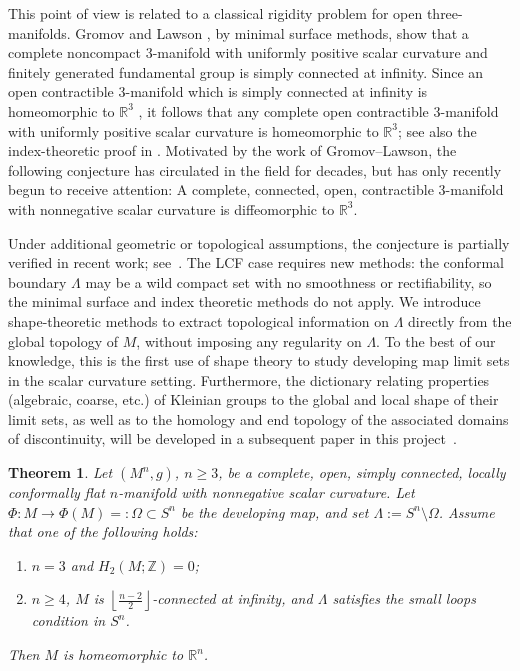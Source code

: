 \documentclass[12pt,oneside,a4paper]{article}
\newtheorem{theoremE}{Theorem}
\theoremstyle{mytheorem}
\theoremstyle{remark}
\theoremstyle{definition}
\begin{document}
This point of view is related to a classical rigidity problem for open
three-manifolds.  Gromov and Lawson
\cite[Corollary~10.9]{MR720933}, by minimal surface methods, show that a
complete noncompact \(3\)-manifold with uniformly positive scalar curvature and finitely
generated fundamental group is simply connected at infinity.  Since an open
contractible \(3\)-manifold which is simply connected at infinity is
homeomorphic to \(\mathbb R^3\) \cite{275662}, it follows that
any complete open contractible \(3\)-manifold with uniformly positive scalar
curvature is homeomorphic to \(\mathbb R^3\); see also the index-theoretic
proof in \cite[Theorem~1]{MR2721617}.  Motivated by the work of Gromov--Lawson, the following conjecture has circulated in the field for decades, but has only recently begun to receive attention: A complete, connected, open, contractible \(3\)-manifold with nonnegative scalar curvature is diffeomorphic to \(\mathbb{R}^3\).

Under additional geometric or topological assumptions, the conjecture is 
partially verified in recent work; see~\cite[p.~2]{2026arXiv260301887C}.
The LCF case requires new methods: the conformal boundary $\Lambda$ may be a wild compact set with no smoothness or
rectifiability, so the minimal surface and index theoretic methods  do not apply.  We introduce shape-theoretic methods to
extract topological information on $\Lambda$ directly from the global
topology of $M$, without imposing any regularity on $\Lambda$.  To the
best of our knowledge, this is the first use of shape theory to study
developing map limit sets in the scalar curvature setting.  Furthermore, the dictionary relating properties (algebraic, coarse, etc.) of Kleinian groups to the global and local shape of their limit sets, as well as to the homology and end topology of the associated domains of discontinuity, will be developed in a subsequent paper in this  project~\cite{DengKleinianScalarShape}.

\begin{theoremE}\label{thm:intro-E}
Let \((M^n,g)\), \(n \ge 3\), be a complete, open, simply connected, locally
conformally flat \(n\)-manifold with nonnegative scalar curvature. Let \(\Phi:M\to \Phi(M)=:\Omega\subset S^n\) be the developing map, and set
\(\Lambda:=S^n\setminus\Omega\). Assume that one of the following holds:
\begin{enumerate}
\item[(i)] \(n=3\) and \(H_2(M;\mathbb Z)=0\);
\item[(ii)] \(n \ge 4\), \(M\) is \(\left\lfloor \frac{n-2}{2}\right\rfloor\)-connected at infinity, and \(\Lambda\) satisfies the small loops condition in \(S^n\).
\end{enumerate}
Then \(M\) is homeomorphic to \(\mathbb R^n\).
\end{theoremE}
\end{document}
